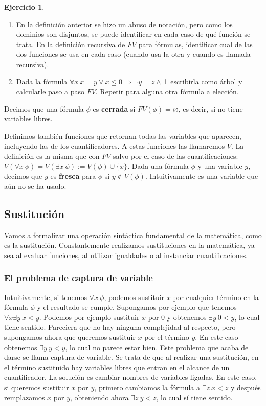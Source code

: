 \documentclass[a4paper, 12pt]{report}
\newcommand{\Ra}{\Rightarrow}
\theoremstyle{definition}
\newtheorem{ejercicio}{Ejercicio}[section]
\begin{document}
\begin{ejercicio}
	\begin{enumerate}
		\item En la definición anterior se hizo un abuso de notación, pero como los dominios son disjuntos, se puede identificar en cada caso de qué función se trata. En la definición recursiva de $FV$ para fórmulas, identificar cual de las dos funciones se usa en cada caso (cuando usa la otra y cuando es llamada recursiva).
		\item Dada la fórmula $\forall x ~x=y\vee x\leq 0\Ra \lnot y=z\wedge \bot$ escribirla como árbol y calcularle paso a paso $FV$. Repetir para alguna otra fórmula a elección.
	\end{enumerate}
\end{ejercicio}

Decimos que una fórmula $\phi$ es \textbf{cerrada} si $FV(\phi)=\varnothing$, es decir, si no tiene variables libres.

Definimos también funciones que retornan todas las variables que aparecen, incluyendo las de los cuantificadores. A estas funciones las llamaremos $V$. La definición es la misma que con $FV$ salvo por el caso de las cuantificaciones: $V(\forall x~\phi)=V(\exists x~\phi):=V(\phi)\cup\{x\}$. Dada una fórmula $\phi$ y una variable $y$, decimos que $y$ es \textbf{fresca} para $\phi$ si $y\not\in V(\phi)$. Intuitivamente es una variable que aún no se ha usado.


\subsection{Sustitución}

Vamos a formalizar una operación sintáctica fundamental de la matemática, como es la sustitución. Constantemente realizamos sustituciones en la matemática, ya sea al evaluar funciones, al utilizar igualdades o al instanciar cuantificaciones.

\subsubsection{El problema de captura de variable}

Intuitivamente, si tenemos $\forall x~\phi$, podemos sustituir $x$ por cualquier término en la fórmula $\phi$ y el resultado se cumple. Supongamos por ejemplo que tenemos $\forall x\exists y~ x<y$. Podemos por ejemplo sustituir $x$ por $0$ y obtenemos $\exists y~0<y$, lo cual tiene sentido. Pareciera que no hay ninguna complejidad al respecto, pero supongamos ahora que queremos sustituir $x$ por el término $y$. En este caso obtenemos $\exists y~y<y$, lo cual no parece estar bien. Este problema que acaba de darse se llama captura de variable. Se trata de que al realizar una sustitución, en el término sustituido hay variables libres que entran en el alcance de un cuantificador. La solución es cambiar nombres de variables ligadas. En este caso, si queremos sustituir $x$ por $y$, primero cambiamos la fórmula a $\exists z~x<z$ y después remplazamos $x$ por $y$, obteniendo ahora $\exists z~y<z$, lo cual sí tiene sentido.
\end{document}
